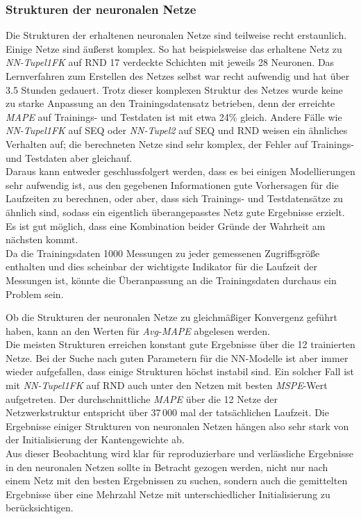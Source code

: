 \documentclass[
	twoside,
	12pt,
	a4paper,
	BCOR10mm,
	DIV14,
	listof=totoc,
	bibliography=totoc,
	headsepline
]{scrreprt}
\begin{document}
\subsubsection{Strukturen der neuronalen Netze}
Die Strukturen der erhaltenen neuronalen Netze sind teilweise recht erstaunlich.
Einige Netze sind äußerst komplex.
So hat beispielsweise das erhaltene Netz zu \textit{NN-Tupel1FK} auf RND 17 verdeckte Schichten mit jeweils 28 Neuronen.
Das Lernverfahren zum Erstellen des Netzes selbst war recht aufwendig und hat über 3.5 Stunden gedauert.
Trotz dieser komplexen Struktur des Netzes wurde keine zu starke Anpassung an den Trainingsdatensatz betrieben, denn der erreichte \textit{MAPE} auf Trainings- und Testdaten ist mit etwa 24\% gleich. Andere Fälle wie \textit{NN-Tupel1FK} auf SEQ oder \textit{NN-Tupel2} auf SEQ und RND weisen ein ähnliches Verhalten auf; die berechneten Netze sind sehr komplex, der Fehler auf Trainings- und Testdaten aber gleichauf.\\
Daraus kann entweder geschlussfolgert werden, dass es bei einigen Modellierungen sehr aufwendig ist, aus den gegebenen Informationen gute Vorhersagen für die Laufzeiten zu berechnen, oder aber, dass sich Trainings- und Testdatensätze zu ähnlich sind, sodass ein eigentlich überangepasstes Netz gute Ergebnisse erzielt.
Es ist gut möglich, dass eine Kombination beider Gründe der Wahrheit am nächsten kommt.\\
Da die Trainingsdaten 1000 Messungen zu jeder gemessenen Zugriffsgröße enthalten und dies scheinbar der wichtigste Indikator für die Laufzeit der Messungen ist, könnte die Überanpassung an die Trainingsdaten durchaus ein Problem sein.\medskip

Ob die Strukturen der neuronalen Netze zu gleichmäßiger Konvergenz geführt haben, kann an den Werten für \textit{Avg-MAPE} abgelesen werden.\\
Die meisten Strukturen erreichen konstant gute Ergebnisse über die 12 trainierten Netze.
Bei der Suche nach guten Parametern für die NN-Modelle ist aber immer wieder aufgefallen, dass einige Strukturen höchst instabil sind.
Ein solcher Fall ist mit \textit{NN-Tupel1FK} auf RND auch unter den Netzen mit besten \textit{MSPE}-Wert aufgetreten.
Der durchschnittliche \textit{MAPE} über die 12 Netze der Netzwerkstruktur entspricht über 37\,000 mal der tatsächlichen Laufzeit.
Die Ergebnisse einiger Strukturen von neuronalen Netzen hängen also sehr stark von der Initialisierung der Kantengewichte ab.\\
Aus dieser Beobachtung wird klar für reproduzierbare und verlässliche Ergebnisse in den neuronalen Netzen sollte in Betracht gezogen werden, nicht nur nach einem Netz mit den besten Ergebnissen zu suchen, sondern auch die gemittelten Ergebnisse über eine Mehrzahl Netze mit unterschiedlicher Initialisierung zu berücksichtigen.
\end{document}

